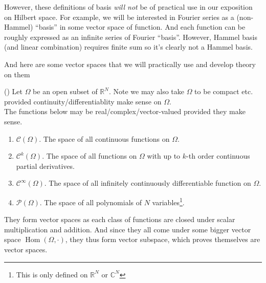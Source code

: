 \documentclass[10pt]{article}
\DeclareMathOperator{\Hom}{Hom}
\begin{document}
\begin{definition}[Dimension]

\end{definition}

However, these definitions of basis \textit{will not} be of practical use in our exposition on Hilbert space. For example, we will be interested in Fourier series as a (non-Hammel) ``basis'' in some vector space of function. And each function can be roughly expressed as an infinite series of Fourier ``basis''. However, Hammel basis (and linear combination) requires finite sum so it's clearly not a Hammel basis.

And here are some vector spaces that we will practically use and develop theory on them

\begin{example} (\cite[Example 1.2.4]{intro-hilbert})
  Let $\Omega$ be an open subset of $\mathbb{R}^N$. Note we may also take $\Omega$ to be compact etc. provided continuity/differentiablity make sense on $\Omega$.\\

  The functions below may be real/complex/vector-valued provided they make sense.
\begin{enumerate}
\item $\mathcal{C}(\Omega)$. The space of all continuous functions on $\Omega$.
\item $\mathcal{C}^k(\Omega)$. The space of all functions on $\Omega$ with up to $k$-th order continuous partial derivatives.
\item $\mathcal{C}^{\infty}(\Omega)$. The space of all infinitely continuously differentiable function on $\Omega$.
\item $\mathcal{P}(\Omega)$. The space of all polynomials of $N$ variables\footnote{This is only defined on $\mathbb{R}^N$ or $\mathbb{C}^N$}.
\end{enumerate}
\end{example}
\begin{remark}
They form vector spaces as each class of functions are closed under scalar multiplication and addition. And since they all come under some bigger vector space $\Hom(\Omega, \cdot)$, they thus form vector subspace, which proves themselves are vector spaces.
\end{remark}
\end{document}

